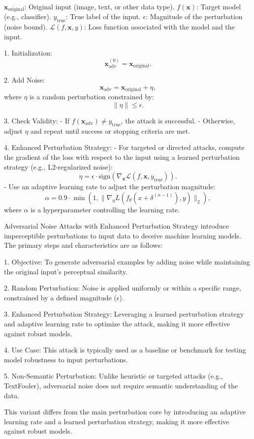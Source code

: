 $\mathbf{x}_{\text{original}}$: Original input (image, text, or other data type).
$f(\mathbf{x})$: Target model (e.g., classifier).
$y_{\text{true}}$: True label of the input.
$\epsilon$: Magnitude of the perturbation (noise bound).
$\mathcal{L}(f, \mathbf{x}, y)$: Loss function associated with the model and the input.



1. Initialization:
   \[
   \mathbf{x}_{\text{adv}}^{(0)} = \mathbf{x}_{\text{original}}.
   \]

2. Add Noise:
   \[
   \mathbf{x}_{\text{adv}} = \mathbf{x}_{\text{original}} + \eta,
   \]
   where $\eta$ is a random perturbation constrained by:
   \[
   \|\eta\| \leq \epsilon.
   \]

3. Check Validity:
   - If $f(\mathbf{x}_{\text{adv}}) \neq y_{\text{true}}$, the attack is successful.
   - Otherwise, adjust $\eta$ and repeat until success or stopping criteria are met.

4. Enhanced Perturbation Strategy:
   - For targeted or directed attacks, compute the gradient of the loss with respect to the input using a learned perturbation strategy (e.g., L2-regularized noise):
     \[
     \eta = \epsilon \cdot \text{sign}(\nabla_{\mathbf{x}} \mathcal{L}(f, \mathbf{x}, y_{\text{true}})).
     \]
   - Use an adaptive learning rate to adjust the perturbation magnitude:
     \[
     \alpha = 0.9 \cdot \min(1, \|\nabla_\eta L(f_\theta(x + \delta^{(n-1)}), y)\|_2),
     \]
     where $\alpha$ is a hyperparameter controlling the learning rate.

Adversarial Noise Attacks with Enhanced Perturbation Strategy introduce imperceptible perturbations to input data to deceive machine learning models. The primary steps and characteristics are as follows:

1. Objective: To generate adversarial examples by adding noise while maintaining the original input's perceptual similarity.

2. Random Perturbation: Noise is applied uniformly or within a specific range, constrained by a defined magnitude ($\epsilon$).

3. Enhanced Perturbation Strategy: Leveraging a learned perturbation strategy and adaptive learning rate to optimize the attack, making it more effective against robust models.

4. Use Case: This attack is typically used as a baseline or benchmark for testing model robustness to input perturbations.

5. Non-Semantic Perturbation: Unlike heuristic or targeted attacks (e.g., TextFooler), adversarial noise does not require semantic understanding of the data.

This variant differs from the main perturbation core by introducing an adaptive learning rate and a learned perturbation strategy, making it more effective against robust models.